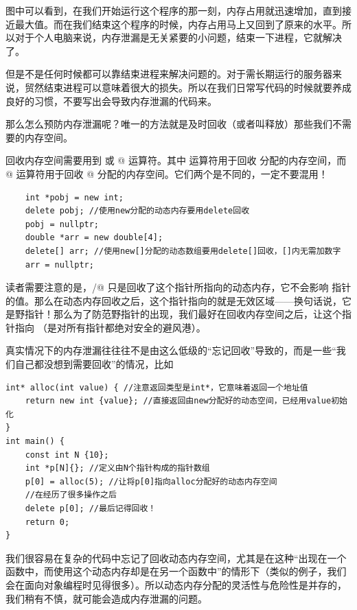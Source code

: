 图中可以看到，在我们开始运行这个程序的那一刻，内存占用就迅速增加，直到接近最大值。而在我们结束这个程序的时候，内存占用马上又回到了原来的水平。所以对于个人电脑来说，内存泄漏是无关紧要的小问题，结束一下进程，它就解决了。\par
但是不是任何时候都可以靠结束进程来解决问题的。对于需长期运行的服务器来说，贸然结束进程可以意味着很大的损失。所以在我们日常写代码的时候就要养成良好的习惯，不要写出会导致内存泄漏的代码来。\par
那么怎么预防内存泄漏呢？唯一的方法就是及时回收（或者叫释放）那些我们不需要的内存空间。\par
回收内存空间需要用到 \lstinline@delete@ 或 \lstinline@delete[]@ 运算符。其中  \lstinline@delete@ 运算符用于回收 \lstinline@new@ 分配的内存空间，而 \lstinline@delete[]@ 运算符用于回收 \lstinline@new[]@ 分配的内存空间。它们两个是不同的，一定不要混用！\par
\begin{lstlisting}
    int *pobj = new int;
    delete pobj; //使用new分配的动态内存要用delete回收
    pobj = nullptr;
    double *arr = new double[4];
    delete[] arr; //使用new[]分配的动态数组要用delete[]回收，[]内无需加数字
    arr = nullptr;
\end{lstlisting}
读者需要注意的是，\lstinline@delete@/\lstinline@delete[]@ 只是回收了这个指针所指向的动态内存，它不会影响 指针的值。那么在动态内存回收之后，这个指针指向的就是无效区域——换句话说，它是野指针！那么为了防范野指针的出现，我们最好在回收内存空间之后，让这个指针指向 \lstinline@nullptr@（\lstinline@nullptr@ 是对所有指针都绝对安全的避风港）。\par
真实情况下的内存泄漏往往往不是由这么低级的``忘记回收''导致的，而是一些``我们自己都没想到需要回收''的情况，比如
\begin{lstlisting}
int* alloc(int value) { //注意返回类型是int*，它意味着返回一个地址值
    return new int {value}; //直接返回由new分配好的动态空间，已经用value初始化
}
int main() {
    const int N {10};
    int *p[N]{}; //定义由N个指针构成的指针数组
    p[0] = alloc(5); //让将p[0]指向alloc分配好的动态内存空间
    //在经历了很多操作之后
    delete p[0]; //最后记得回收！
    return 0;
}
\end{lstlisting}
我们很容易在复杂的代码中忘记了回收动态内存空间，尤其是在这种``\lstinline@new@ 出现在一个函数中，而使用这个动态内存却是在另一个函数中''的情形下（类似的例子，我们会在面向对象编程时见得很多）。所以动态内存分配的灵活性与危险性是并存的，我们稍有不慎，就可能会造成内存泄漏的问题。\par
